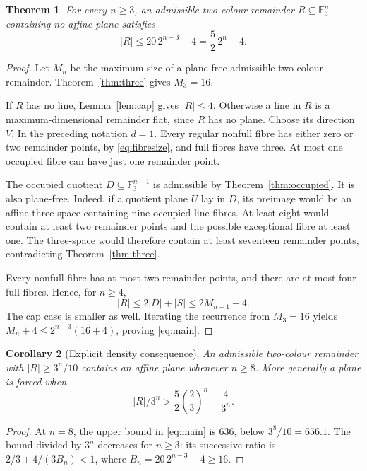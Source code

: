 \documentclass[11pt]{article}
\newtheorem{theorem}{Theorem}[section]
\newtheorem{corollary}[theorem]{Corollary}
\theoremstyle{remark}\newtheorem{remark}[theorem]{Remark}
\newcommand{\F}{\mathbb F_3}
\begin{document}
\begin{theorem}\label{thm:global}
For every $n\geq3$, an admissible two-colour remainder $R\subseteq\F^n$
containing no affine plane satisfies
\begin{equation}\label{eq:main}
 \boxed{\ |R|\leq20\,2^{n-3}-4=\frac52\,2^n-4.\ }
\end{equation}
\end{theorem}
\begin{proof}
Let $M_n$ be the maximum size of a plane-free admissible two-colour
remainder. Theorem~\ref{thm:three} gives $M_3=16$.

If $R$ has no line, Lemma~\ref{lem:cap} gives $|R|\leq4$. Otherwise a line
in $R$ is a maximum-dimensional remainder flat, since $R$ has no plane.
Choose its direction $V$. In the preceding notation $d=1$. Every regular
nonfull fibre has either zero or two remainder points, by
\eqref{eq:fibresize}, and full fibres have three. At most one occupied
fibre can have just one remainder point.

The occupied quotient $D\subseteq\F^{n-1}$ is admissible by
Theorem~\ref{thm:occupied}. It is also plane-free. Indeed, if a quotient
plane $U$ lay in $D$, its preimage would be an affine three-space containing
nine occupied line fibres. At least eight would contain at least two
remainder points and the possible exceptional fibre at least one. The
three-space would therefore contain at least seventeen remainder points,
contradicting Theorem~\ref{thm:three}.

Every nonfull fibre has at most two remainder points, and there are at most
four full fibres. Hence, for $n\geq4$,
\[
 |R|\leq2|D|+|S|\leq2M_{n-1}+4.
\]
The cap case is smaller as well. Iterating the recurrence from $M_3=16$
yields $M_n+4\leq2^{n-3}(16+4)$, proving \eqref{eq:main}.
\end{proof}

\begin{corollary}[Explicit density consequence]\label{cor:density}
An admissible two-colour remainder with $|R|\geq3^n/10$ contains an affine
plane whenever $n\geq8$. More generally a plane is forced when
\[
 |R|/3^n>\frac52\left(\frac23\right)^n-\frac4{3^n}.
\]
\end{corollary}
\begin{proof}
At $n=8$, the upper bound in \eqref{eq:main} is $636$, below
$3^8/10=656.1$. The bound divided by $3^n$ decreases for $n\geq3$:
its successive ratio is $2/3+4/(3B_n)<1$, where $B_n=20\,2^{n-3}-4\geq16$.
\end{proof}
\end{document}
